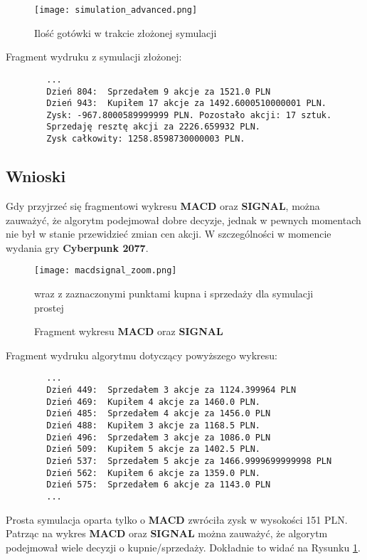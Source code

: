 \documentclass{article}
\begin{document}
    \begin{figure}[H]
        \texttt{[image: simulation\_advanced.png]}
        \centering
        \caption{Ilość gotówki w trakcie złożonej symulacji}
    \end{figure}

Fragment wydruku z symulacji złożonej:
    \begin{verbatim}
        ...
        Dzień 804:  Sprzedałem 9 akcje za 1521.0 PLN
        Dzień 943:  Kupiłem 17 akcje za 1492.6000510000001 PLN.
        Zysk: -967.8000589999999 PLN. Pozostało akcji: 17 sztuk.
        Sprzedaję resztę akcji za 2226.659932 PLN.
        Zysk całkowity: 1258.8598730000003 PLN.
    \end{verbatim}

    \subsection{Wnioski}

    Gdy przyjrzeć się fragmentowi wykresu \textbf{MACD} oraz \textbf{SIGNAL}, można zauważyć, że
    algorytm podejmował dobre decyzje, jednak w pewnych momentach nie był w stanie przewidzieć
    zmian cen akcji. W szczególności w momencie wydania gry \textbf{Cyberpunk 2077}.

    \begin{figure}[H]
        \texttt{[image: macdsignal\_zoom.png]}
        \centering
        \caption{Fragment wykresu \textbf{MACD} oraz \textbf{SIGNAL}}{ wraz z zaznaczonymi punktami kupna i sprzedaży
        dla symulacji prostej}
        \label{fig:macdsignal_zoom}
    \end{figure}

    Fragment wydruku algorytmu dotyczący powyższego wykresu:
    \begin{verbatim}
        ...
        Dzień 449:  Sprzedałem 3 akcje za 1124.399964 PLN
        Dzień 469:  Kupiłem 4 akcje za 1460.0 PLN.
        Dzień 485:  Sprzedałem 4 akcje za 1456.0 PLN
        Dzień 488:  Kupiłem 3 akcje za 1168.5 PLN.
        Dzień 496:  Sprzedałem 3 akcje za 1086.0 PLN
        Dzień 509:  Kupiłem 5 akcje za 1402.5 PLN.
        Dzień 537:  Sprzedałem 5 akcje za 1466.9999699999998 PLN
        Dzień 562:  Kupiłem 6 akcje za 1359.0 PLN.
        Dzień 575:  Sprzedałem 6 akcje za 1143.0 PLN
        ...
    \end{verbatim}

    Prosta symulacja oparta tylko o \textbf{MACD} zwróciła zysk w wysokości 151 PLN.
    Patrząc na wykres \textbf{MACD} oraz \textbf{SIGNAL} można zauważyć, że algorytm
    podejmował wiele decyzji o kupnie/sprzedaży. Dokładnie to widać na Rysunku \ref{fig:macdsignal_zoom}.
\end{document}

